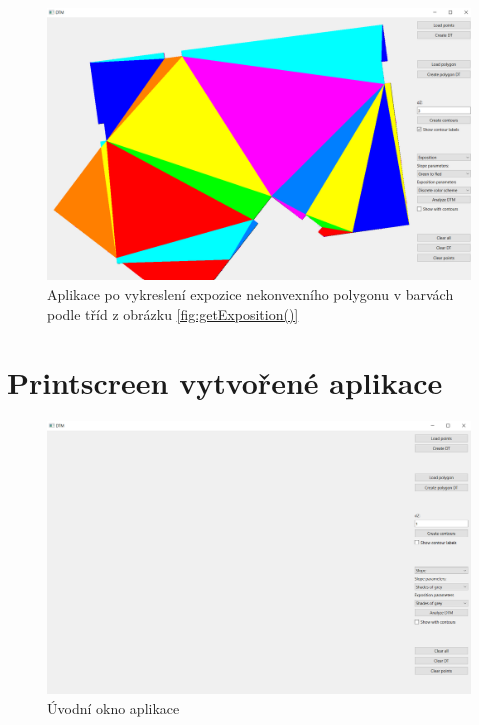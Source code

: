 \documentclass[11pt]{article}
\begin{document}
\begin{figure}[htbh]
	\centering
	\captionsetup{justification=centering}
	\includegraphics[scale=0.35]{images/vystup_AnalyzeDTM_exposition_discrete_pol.png} 
	\caption{Aplikace po vykreslení expozice nekonvexního polygonu v barvách podle tříd z obrázku \ref{fig:getExposition()}}	\label{fig:vystup_AnalyzeDTM_exposition_discrete_pol}
\end{figure} 
\clearpage

\section{Printscreen vytvořené aplikace}
\begin{figure}[htbh]
	\centering
	
	\includegraphics[scale=0.4]{images/aplikace_uvodni_okno.png} 
	\caption{Úvodní okno aplikace}
	\label{fig:uvodni_okno}
\end{figure} 
\end{document}

